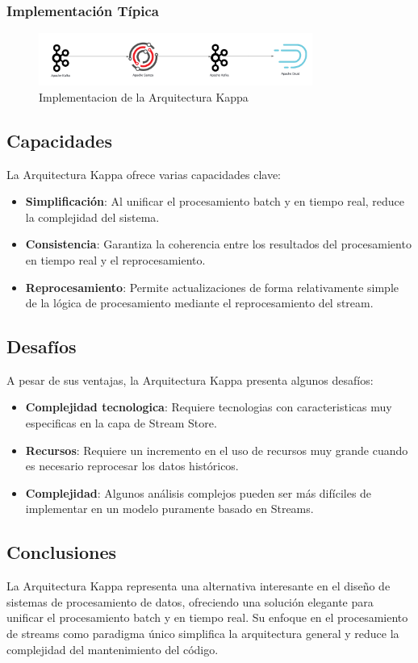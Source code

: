 \subsubsection{Implementación Típica}
\begin{figure}[h]
\centering
\includegraphics[width=0.8\textwidth]{teorico/KappaImplement.png}
\caption{Implementacion de la Arquitectura Kappa}
\label{fig:implementation_arquitectura_kappa}
\end{figure}

\subsection{Capacidades}
La Arquitectura Kappa ofrece varias capacidades clave:
\begin{itemize}
    \item \textbf{Simplificación}: Al unificar el procesamiento batch y en tiempo real, reduce la complejidad del sistema.
    \item \textbf{Consistencia}: Garantiza la coherencia entre los resultados del procesamiento en tiempo real y el reprocesamiento.
    \item \textbf{Reprocesamiento}: Permite actualizaciones de forma relativamente simple de la lógica de procesamiento mediante el reprocesamiento del stream.
\end{itemize}

\subsection{Desafíos}
A pesar de sus ventajas, la Arquitectura Kappa presenta algunos desafíos:
\begin{itemize}
    \item \textbf{Complejidad tecnologica}: Requiere tecnologias con caracteristicas muy especificas en la capa de Stream Store.
    \item \textbf{Recursos}: Requiere un incremento en el uso de recursos muy grande cuando es necesario reprocesar los datos históricos.
    \item \textbf{Complejidad}: Algunos análisis complejos pueden ser más difíciles de implementar en un modelo puramente basado en Streams.
\end{itemize}

\subsection{Conclusiones}
La Arquitectura Kappa representa una alternativa interesante en el diseño de sistemas de procesamiento de datos, 
ofreciendo una solución elegante para unificar el procesamiento batch y en tiempo real. 
Su enfoque en el procesamiento de streams como paradigma único simplifica la arquitectura general y reduce la complejidad del mantenimiento del código.
\newpage